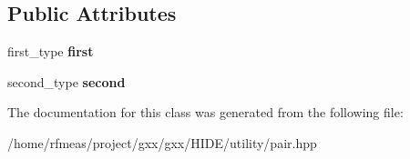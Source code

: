 \subsection*{Public Attributes}
\begin{DoxyCompactItemize}
\item 
first\+\_\+type {\bfseries first}\hypertarget{classpair_a27290c1b5c453389248ba979174d5707}{}\label{classpair_a27290c1b5c453389248ba979174d5707}

\item 
second\+\_\+type {\bfseries second}\hypertarget{classpair_ad99a9b06e505f632e68ada3f1dc3f436}{}\label{classpair_ad99a9b06e505f632e68ada3f1dc3f436}

\end{DoxyCompactItemize}


The documentation for this class was generated from the following file\+:\begin{DoxyCompactItemize}
\item 
/home/rfmeas/project/gxx/gxx/\+H\+I\+D\+E/utility/pair.\+hpp\end{DoxyCompactItemize}
